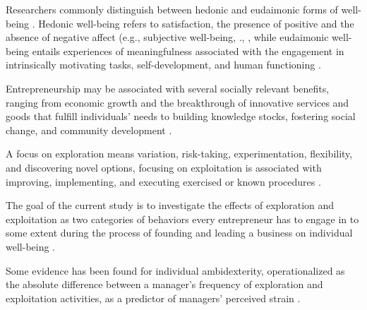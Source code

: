 \documentclass[man, 12pt, a4paper, noextraspace]{apa6}
\begin{document}
Researchers commonly distinguish between hedonic and eudaimonic forms of well-being \parencite[e.g.,][]{Ryan2001}. 
Hedonic well-being refers to satisfaction, the presence of positive and the absence of negative aﬀect (e.g., subjective well-being, \citeauthor{Diener.1984}., \citeyear{Diener.1984}, while eudaimonic well-being entails experiences of meaningfulness associated with the engagement in intrinsically motivating tasks, self-development, and human functioning \parencite[e.g.,][]{Ryan2001}. 

Entrepreneurship may be associated with several socially relevant benefits, ranging from economic growth and the breakthrough of innovative services and goods that fulfill individuals' needs to building knowledge stocks, fostering social change, and community development \parencite[e.g.,][]{Wiklund.2019, Zahra2016, Acs2013}. 

A focus on exploration means variation, risk-taking, experimentation, flexibility, and discovering novel options, focusing on exploitation is associated with improving, implementing, and executing exercised or known procedures \parencite{March.1991, Good.2013}.

The goal of the current study is to investigate the effects of exploration and exploitation as two categories of behaviors every entrepreneur has to engage in to some extent during the process of founding and leading a business on individual well-being \parencite{Siren.2012, Uotila2009, DuaneIreland2007, Rosing.2017}.

Some evidence has been found for individual ambidexterity, operationalized as the absolute difference between a manager’s frequency of exploration and exploitation activities, as a predictor of managers' perceived strain \parencite{Keller2015}.

\end{document}
